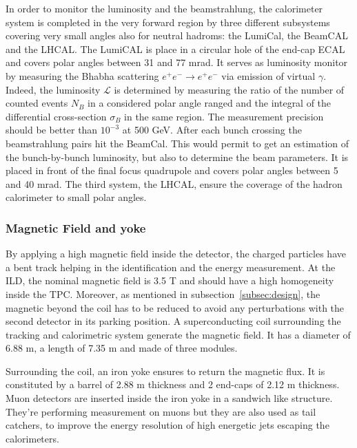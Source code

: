       In order to monitor the luminosity and the beamstrahlung, the calorimeter system is completed in the very forward region by three different subsystems covering very small angles also for neutral hadroms: the LumiCal, the BeamCAL and the \gls{LHCAL}.
      The LumiCAL is place in a circular hole of the end-cap \gls{ECAL} and covers polar angles between 31 and 77 mrad. 
      It serves as luminosity monitor by measuring the Bhabha scattering $e^+e^- \rightarrow e^+e^-$ via emission of virtual $\gamma$.
      Indeed, the luminosity $\mathcal{L}$ is determined by measuring  the ratio of the number of counted events $N_B$ in a considered polar angle ranged and the integral of the differential cross-section $\sigma_B$ in the same region.
      The measurement precision should be better than $10^{-3}$ at 500 GeV.
      After each bunch crossing the beamstrahlung pairs hit the BeamCal.
      This would permit to get an estimation of the bunch-by-bunch luminosity, but also to determine the beam parameters.
      It is placed in front of the final focus quadrupole and covers polar angles between 5 and 40 mrad.
      The third system, the \gls{LHCAL}, ensure the coverage of the hadron calorimeter to small polar angles.

      \subsubsection{Magnetic Field and yoke}

     By applying a high magnetic field inside the detector, the charged particles have a bent track helping in the identification and the energy measurement.
     At the \gls{ILD}, the nominal magnetic field is 3.5 T and should have a high homogeneity inside the TPC.
     Moreover, as mentioned in subsection~\ref{subsec:design}, the magnetic beyond the coil has to be reduced to avoid any perturbations with the second detector in its parking position.
     A superconducting coil surrounding the tracking and calorimetric system generate the magnetic field.
     It has a diameter of 6.88 m, a length of 7.35 m and made of three modules.

     Surrounding the coil, an iron yoke ensures to return the magnetic flux. 
     It is constituted by a barrel of 2.88 m thickness and 2 end-caps of 2.12 m thickness.
     Muon detectors are inserted inside the iron yoke in a sandwich like structure.
     They're performing measurement on muons but they are also used as tail catchers, to improve the energy resolution of high energetic jets escaping the calorimeters. 



